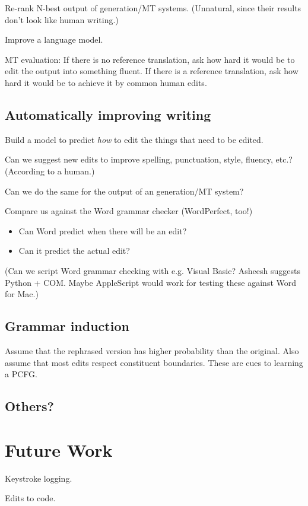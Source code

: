 \documentclass[11pt]{article}
\begin{document}
Re-rank N-best output of generation/MT systems.  (Unnatural, 
since their results don't look like human writing.)

Improve a language model.

MT evaluation: If there is no reference translation, ask how hard it
would be to edit the output into something fluent.  If there is a
reference translation, ask how hard it would be to achieve it by
common human edits.

\subsection{Automatically improving writing}

Build a model to predict {\em how} to edit the things
that need to be edited.

Can we suggest new edits to improve spelling, punctuation, style,
fluency, etc.?  (According to a human.)

Can we do the same for the output of an generation/MT system?

Compare us against the Word grammar checker (WordPerfect, too!)
\begin{itemize}
\item Can Word predict when there will be an edit?
\item Can it predict the actual edit?
\end{itemize}
(Can we script Word grammar checking with e.g. Visual Basic?  Asheesh
suggests Python + COM.  Maybe AppleScript would work for testing these
against Word for Mac.)

\subsection{Grammar induction}

Assume that the rephrased version has higher probability than
the original.  Also assume that most edits respect constituent 
boundaries.  These are cues to learning a PCFG.

\subsection{Others?}

\section{Future Work}

Keystroke logging.

Edits to code.


% 
\end{document}
